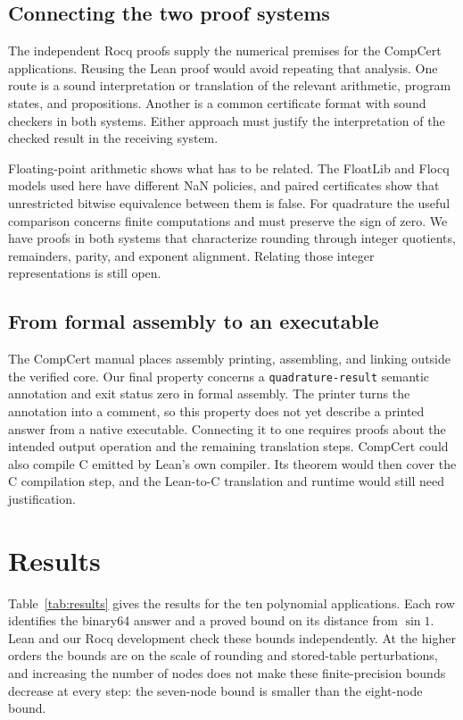 \documentclass[11pt]{article}
\newcommand{\code}[1]{%
  \ifmmode\text{\texttt{\detokenize{#1}}}\else\nolinkurl{#1}\fi}
\begin{document}
\subsection{Connecting the two proof systems}

The independent Rocq proofs supply the numerical premises for the
CompCert applications. Reusing the Lean proof would avoid repeating that
analysis. One route is a sound interpretation or translation of
the relevant arithmetic, program states, and propositions. Another is a
common certificate format with sound checkers in both systems. Either
approach must justify the interpretation of the checked result in the
receiving system.

Floating-point arithmetic shows what has to be related. The FloatLib and
Flocq models used here have different NaN policies, and paired certificates
show that unrestricted bitwise equivalence between them is false. For
quadrature the useful comparison concerns finite computations and must
preserve the sign of zero. We have proofs in both systems that
characterize rounding through integer quotients, remainders, parity, and
exponent alignment. Relating those integer representations is still open.

\subsection{From formal assembly to an executable}

The CompCert manual places assembly printing, assembling, and linking
outside the verified core. Our final property concerns a
\code{quadrature-result} semantic annotation and exit status zero in
formal assembly. The printer turns the annotation into a comment, so this
property does not yet describe a printed answer from a native executable.
Connecting it to one requires proofs about the intended output operation
and the remaining translation steps. CompCert could also compile C emitted
by Lean's own compiler. Its theorem would then cover the C compilation
step, and the Lean-to-C translation and runtime would still need
justification.

\section{Results}
\label{sec:evidence}

Table~\ref{tab:results} gives the results for the ten polynomial
applications. Each row identifies the binary64 answer and a proved bound on
its distance from $\sin1$. Lean and our Rocq development check these bounds
independently. At the higher orders the bounds are on the scale of rounding
and stored-table perturbations, and increasing the number of nodes does not
make these finite-precision bounds decrease at every step: the seven-node
bound is smaller than the eight-node bound.
\end{document}
